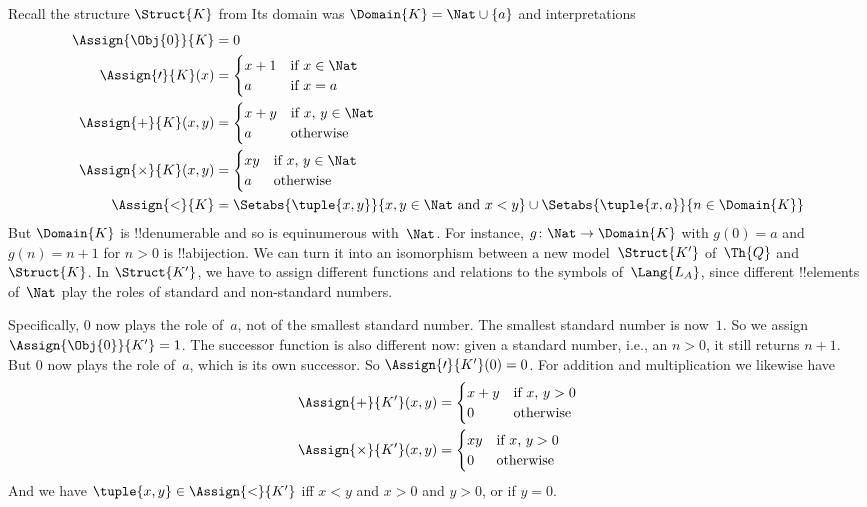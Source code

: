 \documentclass[../../../include/open-logic-section]{subfiles}
\begin{document}
\begin{ex}
Recall the structure $\Struct{K}$ from 
Its domain was $\Domain{K} = \Nat
\cup \{a\}$ and interpretations
\begin{align*}
  \Assign{\Obj{0}}{K} & = 0\\
  \Assign{\prime}{K}(x) & =
  \begin{cases}
    x+1 & \text{if $x\in \Nat$}\\
    a & \text{if $x = a$}
  \end{cases}\\
  \Assign{+}{K}(x, y) & =
  \begin{cases}
    x+y & \text{if $x$, $y \in\Nat$}\\
    a & \text{otherwise}
  \end{cases}\\
  \Assign{\times}{K}(x, y) & =
  \begin{cases}
    xy & \text{if $x$, $y \in\Nat$}\\
    a & \text{otherwise}\\
  \end{cases}\\
  \Assign{<}{K} & =
  \Setabs{\tuple{x,y}}{x, y \in \Nat \text{ and } x<y} \cup
  \Setabs{\tuple{x,a}}{n \in \Domain{K}}
\end{align*}
But $\Domain{K}$ is !!{denumerable} and so is equinumerous
with~$\Nat$. For instance, $g\colon \Nat \to \Domain{K}$ with $g(0) =
a$ and $g(n) = n+1$ for $n>0$ is !!a{bijection}.  We can turn it into
an isomorphism between a new model~$\Struct{K'}$ of~$\Th{Q}$ and
$\Struct{K}$.  In $\Struct{K'}$, we have to assign different functions
and relations to the symbols of~$\Lang{L_A}$, since different
!!{element}s of~$\Nat$ play the roles of standard and non-standard
numbers.

Specifically, $0$ now plays the role of~$a$, not of the smallest
standard number. The smallest standard number is now~$1$. So we assign
$\Assign{\Obj{0}}{K'} = 1$. The successor function is also different
now: given a standard number, i.e., an $n > 0$, it still returns
$n+1$. But $0$ now plays the role of~$a$, which is its own
successor. So $\Assign{\prime}{K'}(0) = 0$.  For addition and
multiplication we likewise have
\begin{align*}
\Assign{+}{K'}(x, y) & =
  \begin{cases}
    x+y & \text{if $x$, $y >0$}\\
    0 & \text{otherwise}
  \end{cases}\\
  \Assign{\times}{K'}(x, y) & =
  \begin{cases}
    xy & \text{if $x$, $y > 0$}\\
    0 & \text{otherwise}\\
  \end{cases}
\end{align*}
And we have $\tuple{x, y} \in \Assign{<}{K'}$ iff $x < y$ and $x > 0$
and $y > 0$, or if $y = 0$.


\end{ex}
\end{document}
